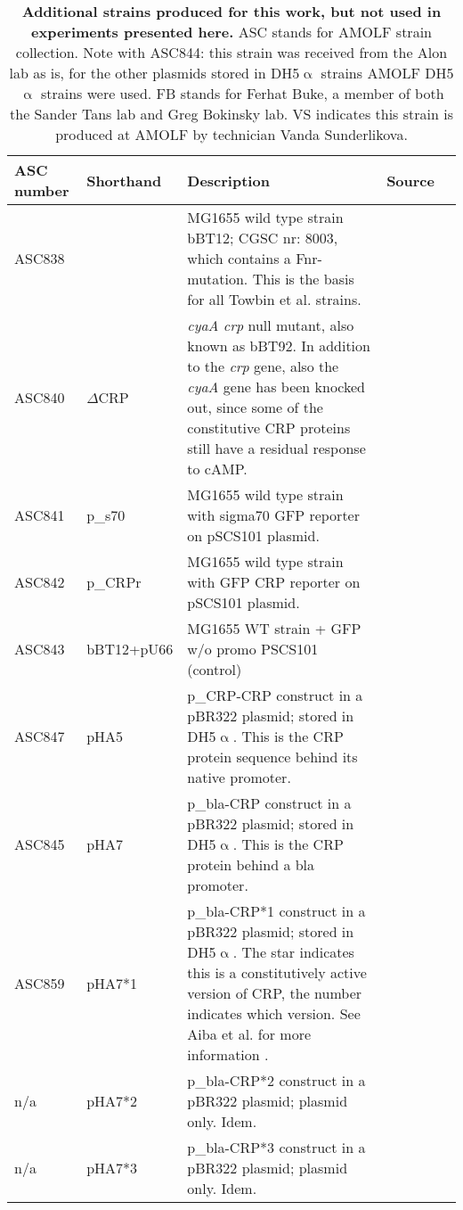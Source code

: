 \begin{table}[h]
	\begin{tabularx}{\textwidth}{llXll}
		
		\textbf{ASC number}	& \textbf{Shorthand} & \textbf{Description}	& \textbf{Source} \\
		\hline
%				
%		
ASC838	& 		& MG1655 wild type strain bBT12; CGSC nr: 8003, which contains a Fnr- mutation. This is the basis for all Towbin et al. strains. & \cite{Towbin2017} \\
ASC840 & $\Delta$CRP &	\textit{cyaA} \textit{crp} null mutant, also known as bBT92. In addition to the \textit{crp} gene, also the \textit{cyaA} gene has been knocked out, since some of the constitutive CRP proteins still have a residual response to cAMP. & \cite{Towbin2017} \\
%		
ASC841 & 	p\_s70 & MG1655 wild type strain with sigma70 GFP reporter on pSCS101 plasmid. & \cite{Towbin2017} \\
ASC842 &	p\_CRPr & MG1655 wild type strain with GFP CRP reporter on pSCS101 plasmid. & \cite{Towbin2017} \\
%
ASC843	&	bBT12+pU66	& MG1655 WT strain + GFP w/o promo PSCS101 (control) & \cite{Towbin2017} \\
%
%
ASC847	&	pHA5	& p\_CRP-CRP construct in a pBR322 plasmid; stored in DH5$\upalpha$. This is the CRP protein sequence behind its native promoter. & \cite{Aiba1985, Towbin2017} \\
ASC845	&	pHA7	& p\_bla-CRP construct in a pBR322 plasmid; stored in DH5$\upalpha$. This is the CRP protein behind a bla promoter. & \cite{Aiba1985, Towbin2017} \\
ASC859	&	pHA7*1	& p\_bla-CRP*1 construct in a pBR322 plasmid; stored in DH5$\upalpha$. The star indicates this is a constitutively active version of CRP, the number indicates which version. See Aiba et al. for more information \cite{Aiba1985}. & \cite{Aiba1985, Towbin2017} \\
n/a 	&	pHA7*2	& p\_bla-CRP*2 construct in a pBR322 plasmid; plasmid only. Idem. & \cite{Aiba1985, Towbin2017} \\
n/a		&	pHA7*3	& p\_bla-CRP*3 construct in a pBR322 plasmid; plasmid only. Idem. & \cite{Aiba1985, Towbin2017} \\
	\end{tabularx}
\label{table:CRP:extrastrains}
\caption{\textbf{Additional strains produced for this work, but not used in experiments presented here.} ASC stands for AMOLF strain collection.
    Note with ASC844: this strain was received from the Alon lab as is, for the other plasmids stored in DH5$\upalpha$ strains AMOLF DH5$\upalpha$ strains were used. FB stands for Ferhat Buke, a member of both the Sander Tans lab and Greg Bokinsky lab. VS indicates this strain is produced at AMOLF by technician Vanda Sunderlikova.}
\end{table}

